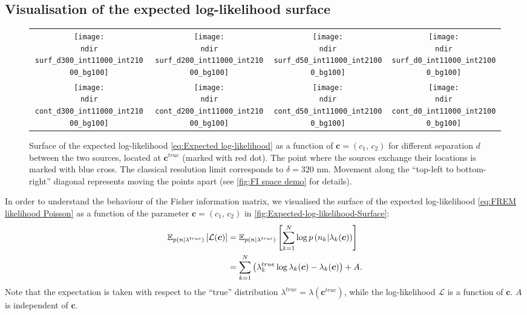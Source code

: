 \subsection{Visualisation of the expected log-likelihood surface\label{sub:LL surface}}
\begin{figure}[hbt!]
	\centering
	\newcommand{\sizeff}{.18}
	\newcommand{\sizegg}{.16}
	\newcommand{\ndir}{\qd gFREM/images/LLsurface/}
	\begin{tabular}{cccc}
		\subfloat[$d=300$ nm]{\texttt{[image: \\ndir surf\_d300\_int11000\_int21000\_bg100]}} 		
		& \subfloat[$d=200$ nm]{\texttt{[image: \\ndir surf\_d200\_int11000\_int21000\_bg100]}} 		
		& \subfloat[$d=50$ nm]{\texttt{[image: \\ndir surf\_d50\_int11000\_int21000\_bg100]}} 		
		& \subfloat[$d=0$ nm]{\texttt{[image: \\ndir surf\_d0\_int11000\_int21000\_bg100]}} 		
		\tabularnewline
		\subfloat[$d=300$ nm]{\texttt{[image: \\ndir cont\_d300\_int11000\_int21000\_bg100]}} 
		& \subfloat[$d=200$ nm]{\texttt{[image: \\ndir cont\_d200\_int11000\_int21000\_bg100]}} 		
		& \subfloat[$d=50$ nm]{\texttt{[image: \\ndir cont\_d50\_int11000\_int21000\_bg100]}} 		
		& \subfloat[$d=0$ nm]{\texttt{[image: \\ndir cont\_d0\_int11000\_int21000\_bg100]}} 		
		\tabularnewline
	\end{tabular}
	\caption{Surface of the expected log-likelihood \autoref{eq:Expected log-likelihood} as a function of $\bm{c}=(c_1,\, c_2)$ for different separation $d$ between the two sources, located at $\bm{c}^{true}$ (marked with red dot). The point where the sources exchange their locations is marked with blue cross. The classical resolution limit corresponds to $\delta=320$ nm. Movement along the ``top-left to bottom-right'' diagonal represents moving the points apart (see \autoref{fig:FI space demo} for details).}	
	\label{fig:Expected-log-likelihood-Surface}
\end{figure}

In order to understand the behaviour of the Fisher information matrix, we visualised the surface of the expected log-likelihood \autoref{eq:FREM likelihood Poisson} as a function of the parameter $\bm{c}=(c_1,\, c_2)$ in \autoref{fig:Expected-log-likelihood-Surface}:
%
\begin{alignat}{2}
	\mathbb{E}_{p(n|\lambda^{true})}\left[\mathcal{L}(\bm{c})\right]
	&=\mathbb{E}_{p(n|\lambda^{true})}\left[\sum_{k=1}^N\log p\left(n_k|\lambda_k(\bm{c})\right)\right]\nonumber\\
	&=\sum_{k=1}^N\left(\lambda_k^{true}\log\lambda_k(\bm{c})-\lambda_k(\bm{c})\right)+A.
	\label{eq:Expected log-likelihood}
\end{alignat}
%
Note that the expectation is taken with respect to the ``true'' distribution $\lambda^{true}=\lambda(\bm{c}^{true})$, while the log-likelihood $\mathcal{L}$ is a function of $\bm{c}$. $A$ is independent of $\bm{c}$. 

